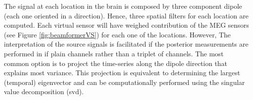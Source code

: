 The signal at each location in the brain is composed by three component dipole (each one oriented in a direction). Hence, three spatial filters for each location are computed. Each virtual sensor will have weighed contribution of the MEG sensors (see Figure \ref{fig:beamformerVS}) for each one of the locations. However, The interpretation of the source signals is facilitated if the posterior measurements are performed in if plain channels rather than a triplet of channels. The most common option is to project the time-series along the dipole direction that explains most variance. This projection is equivalent to determining the largest (temporal) eigenvector and can be computationally performed using the singular value decomposition (svd).


